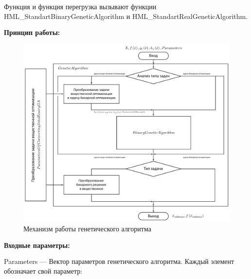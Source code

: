 Функция и функция перегрузка вызывают функции HML\_StandartBinaryGeneticAlgorithm и  HML\_StandartRealGeneticAlgorithm.

\textbf{Принцип работы:}

\begin{figure} [h]
  \center
  \includegraphics [scale=0.5] {HML_StandartGeneticAlgorithm_Sheme}
  \caption{Механизм работы генетического алгоритма} 
\end{figure}

\textbf{Входные параметры:}
 
Parameters --- Вектор параметров генетического алгоритма. Каждый элемент обозначает свой параметр:
 
